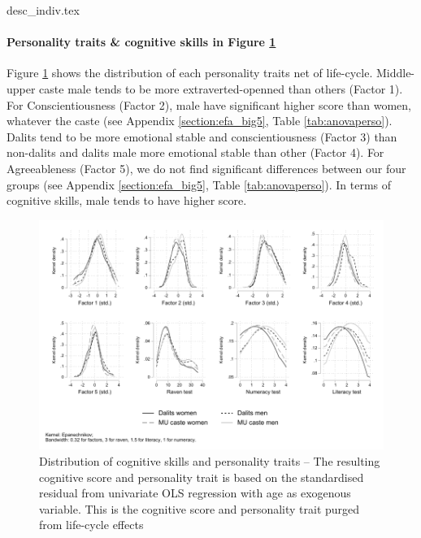 \documentclass[a4paper, 11pt, onecolumn]{article}
\begin{document}
{desc_indiv.tex}

\paragraph{Personality traits \& cognitive skills in Figure \ref{fig:EGOscore}}

Figure \ref{fig:EGOscore} shows the distribution of each personality traits net of life-cycle.
Middle-upper caste male tends to be more extraverted-openned than others (Factor 1).
For Conscientiousness (Factor 2), male have significant higher score than women, whatever the caste (see Appendix \ref{section:efa_big5}, Table \ref{tab:anovaperso}).
Dalits tend to be more emotional stable and conscientiousness (Factor 3) than non-dalits
and dalits male more emotional stable than other (Factor 4).
For Agreeableness (Factor 5), we do not find significant differences between our four groups (see Appendix \ref{section:efa_big5}, Table \ref{tab:anovaperso}).
In terms of cognitive skills, male tends to have higher score.


\begin{figure}[ht]
\raggedright
\includegraphics[width=\textwidth]{INPUT/Kernel_perso}
\caption{Distribution of cognitive skills and personality traits -- The resulting cognitive score and personality trait is based on the standardised residual from univariate OLS regression with age as exogenous variable. This is the cognitive score and personality trait purged from life-cycle effects}
\label{fig:EGOscore}
\end{figure}
\end{document}
